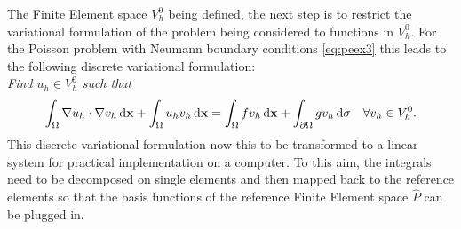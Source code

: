 The Finite Element space $V^0_h$ being defined, the next step is to restrict the variational formulation of  the problem being considered to functions in $V^0_h$. For the Poisson problem with Neumann boundary conditions \eqref{eq:peex3} this leads to the following discrete variational formulation:\\
\textit{ Find $u_h\in V^0_h$ such that}
\begin{equation}\label{eq:h1disc}
\int_{\Omega} \nabla u_h\cdot\nabla v_h\,{\rm d} \mathbf{x} +\int_{\Omega} u_hv_h\,{\rm d} \mathbf{x} =\int_{\Omega} fv_h\,{\rm d} \mathbf{x}
+\int_{\partial\Omega} gv_h \,{\rm d} \sigma \quad\forall v_h\in V^0_h.
\end{equation}
This discrete variational formulation now this to be transformed to a linear system for practical implementation on a computer. To this aim, the integrals need to be decomposed on single elements and then mapped back to the reference elements so that the basis functions of the reference Finite Element space $\hat{P}$ can be plugged in.

